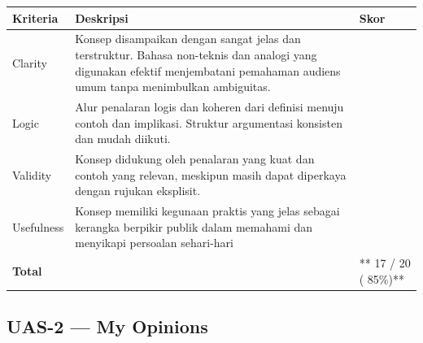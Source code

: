 \documentclass[
  letterpaper,
  DIV=11,
  numbers=noendperiod]{scrreprt}
\begin{document}
\begin{longtable}[]{@{}
  >{\raggedright\arraybackslash}p{}
  >{\raggedright\arraybackslash}p{}
  >{\raggedright\arraybackslash}p{}@{}}
\toprule\noalign{}
\begin{minipage}[b]{\linewidth}\raggedright
Kriteria
\end{minipage} & \begin{minipage}[b]{\linewidth}\raggedright
Deskripsi
\end{minipage} & \begin{minipage}[b]{\linewidth}\raggedright
Skor
\end{minipage} \\
\midrule\noalign{}
\endhead
\bottomrule\noalign{}
\endlastfoot
Clarity & Konsep disampaikan dengan sangat jelas dan terstruktur. Bahasa
non-teknis dan analogi yang digunakan efektif menjembatani pemahaman
audiens umum tanpa menimbulkan ambiguitas. & 5 \\
Logic & Alur penalaran logis dan koheren dari definisi menuju contoh dan
implikasi. Struktur argumentasi konsisten dan mudah diikuti. & 4 \\
Validity & Konsep didukung oleh penalaran yang kuat dan contoh yang
relevan, meskipun masih dapat diperkaya dengan rujukan eksplisit. & 4 \\
Usefulness & Konsep memiliki kegunaan praktis yang jelas sebagai
kerangka berpikir publik dalam memahami dan menyikapi persoalan
sehari-hari & 4 \\
\textbf{Total} & & ** 17 / 20 ( 85\%)** \\
\end{longtable}

\subsection{\texorpdfstring{\textbf{UAS-2 --- My
Opinions}}{UAS-2 --- My Opinions}}\label{uas-2-my-opinions-1}
\end{document}
